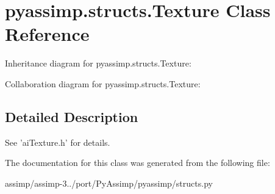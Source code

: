 \hypertarget{classpyassimp_1_1structs_1_1_texture}{\section{pyassimp.\+structs.\+Texture Class Reference}
\label{classpyassimp_1_1structs_1_1_texture}
}


Inheritance diagram for pyassimp.\+structs.\+Texture\+:


Collaboration diagram for pyassimp.\+structs.\+Texture\+:


\subsection{Detailed Description}
\begin{DoxyVerb}See 'aiTexture.h' for details.
\end{DoxyVerb}
 

The documentation for this class was generated from the following file\+:\begin{DoxyCompactItemize}
\item 
assimp/assimp-\/3../port/\+Py\+Assimp/pyassimp/structs.\+py\end{DoxyCompactItemize}
